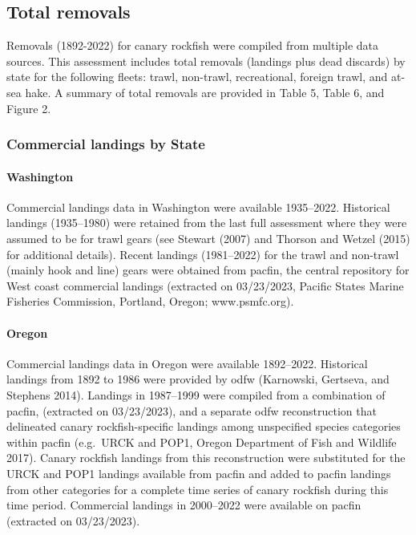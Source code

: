\documentclass[11pt,
  english,
  letterpaper,
]{article}
\begin{document}
\newcommand{\lt}{\ensuremath <}
\newcommand{\gt}{\ensuremath >}

\hypertarget{total-removals}{%
\subsection{Total removals}\label{total-removals}}

Removals (1892-2022) for canary rockfish were compiled from multiple data sources. This assessment includes total removals (landings plus dead discards) by state for the following fleets: trawl, non-trawl, recreational, foreign trawl, and at-sea hake. A summary of total removals are provided in Table 5, Table 6, and Figure 2.

\hypertarget{commercial-landings-by-state}{%
\subsubsection{Commercial landings by State}\label{commercial-landings-by-state}}

\hypertarget{washington}{%
\paragraph{Washington}\label{washington}}

Commercial landings data in Washington were available 1935--2022. Historical landings (1935--1980) were retained from the last full assessment where they were assumed to be for trawl gears (see Stewart (2007) and Thorson and Wetzel (2015) for additional details). Recent landings (1981--2022) for the trawl and non-trawl (mainly hook and line) gears were obtained from \gls{pacfin}, the central repository for West coast commercial landings (extracted on 03/23/2023, Pacific States Marine Fisheries Commission, Portland, Oregon; www.psmfc.org).

\hypertarget{oregon}{%
\paragraph{Oregon}\label{oregon}}

Commercial landings data in Oregon were available 1892--2022. Historical landings from 1892 to 1986 were provided by \gls{odfw} (Karnowski, Gertseva, and Stephens 2014). Landings in 1987--1999 were compiled from a combination of \gls{pacfin}, (extracted on 03/23/2023), and a separate \gls{odfw} reconstruction that delineated canary rockfish-specific landings among unspecified species categories within \gls{pacfin} (e.g.~URCK and POP1, Oregon Department of Fish and Wildlife 2017). Canary rockfish landings from this reconstruction were substituted for the URCK and POP1 landings available from \gls{pacfin} and added to \gls{pacfin} landings from other categories for a complete time series of canary rockfish during this time period. Commercial landings in 2000--2022 were available on \gls{pacfin} (extracted on 03/23/2023).
\end{document}
